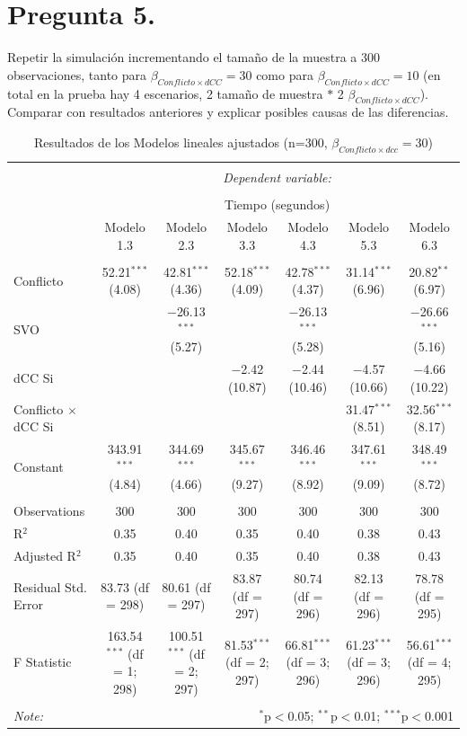 \documentclass[
  spanish,
  10pt,
]{article}
\begin{document}
\section{Pregunta 5.}\label{pregunta-5.}

Repetir la simulación incrementando el tamaño de la muestra a 300
observaciones, tanto para \(\beta_{Conflicto \times dCC} = 30\) como
para \(\beta_{Conflicto \times dCC} = 10\) (en total en la prueba hay 4
escenarios, 2 tamaño de muestra \(\ast\) 2
\(\beta_{Conflicto \times dCC}\)). Comparar con resultados anteriores y
explicar posibles causas de las diferencias.

\begin{table}[H] \centering 
  \caption{Resultados de los Modelos lineales ajustados (n=300, $\beta_{Conflicto \times dcc} = 30$)} 
  \label{} 
\tiny 
\begin{tabular}{@{\extracolsep{5pt}}lcccccc} 
\\[-1.8ex]\hline 
\hline \\[-1.8ex] 
 & \multicolumn{6}{c}{\textit{Dependent variable:}} \\ 
\cline{2-7} 
\\[-1.8ex] & \multicolumn{6}{c}{Tiempo (segundos)} \\ 
 & Modelo 1.3 & Modelo 2.3 & Modelo 3.3 & Modelo 4.3 & Modelo 5.3 & Modelo 6.3 \\ 
\hline \\[-1.8ex] 
 Conflicto & 52.21$^{***}$ (4.08) & 42.81$^{***}$ (4.36) & 52.18$^{***}$ (4.09) & 42.78$^{***}$ (4.37) & 31.14$^{***}$ (6.96) & 20.82$^{**}$ (6.97) \\ 
  SVO &  & $-$26.13$^{***}$ (5.27) &  & $-$26.13$^{***}$ (5.28) &  & $-$26.66$^{***}$ (5.16) \\ 
  dCC Si &  &  & $-$2.42 (10.87) & $-$2.44 (10.46) & $-$4.57 (10.66) & $-$4.66 (10.22) \\ 
  Conflicto $\times$ dCC Si &  &  &  &  & 31.47$^{***}$ (8.51) & 32.56$^{***}$ (8.17) \\ 
  Constant & 343.91$^{***}$ (4.84) & 344.69$^{***}$ (4.66) & 345.67$^{***}$ (9.27) & 346.46$^{***}$ (8.92) & 347.61$^{***}$ (9.09) & 348.49$^{***}$ (8.72) \\ 
 \hline \\[-1.8ex] 
Observations & 300 & 300 & 300 & 300 & 300 & 300 \\ 
R$^{2}$ & 0.35 & 0.40 & 0.35 & 0.40 & 0.38 & 0.43 \\ 
Adjusted R$^{2}$ & 0.35 & 0.40 & 0.35 & 0.40 & 0.38 & 0.43 \\ 
Residual Std. Error & 83.73 (df = 298) & 80.61 (df = 297) & 83.87 (df = 297) & 80.74 (df = 296) & 82.13 (df = 296) & 78.78 (df = 295) \\ 
F Statistic & 163.54$^{***}$ (df = 1; 298) & 100.51$^{***}$ (df = 2; 297) & 81.53$^{***}$ (df = 2; 297) & 66.81$^{***}$ (df = 3; 296) & 61.23$^{***}$ (df = 3; 296) & 56.61$^{***}$ (df = 4; 295) \\ 
\hline 
\hline \\[-1.8ex] 
\textit{Note:}  & \multicolumn{6}{r}{$^{*}$p$<$0.05; $^{**}$p$<$0.01; $^{***}$p$<$0.001} \\ 
\end{tabular} 
\end{table}
\end{document}
